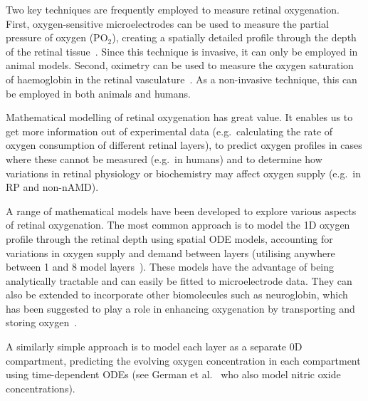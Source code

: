 \documentclass{article}
\begin{document}
Two key techniques are frequently employed to measure retinal oxygenation. First, oxygen-sensitive microelectrodes can be used to measure the partial pressure of oxygen (PO$_2$), creating a spatially detailed profile through the depth of the retinal tissue~\cite{Linsenmeier_and_Zhang_2017}. Since this technique is invasive, it can only be employed in animal models. Second, oximetry can be used to measure the oxygen saturation of haemoglobin in the retinal vasculature~\cite{Linsenmeier_and_Zhang_2017}. As a non-invasive technique, this can be employed in both animals and humans.

Mathematical modelling of retinal oxygenation has great value. It enables us to get more information out of experimental data (e.g.\ calculating the rate of oxygen consumption of different retinal layers), to predict oxygen profiles in cases where these cannot be measured (e.g.\ in humans) and to determine how variations in retinal physiology or biochemistry may affect oxygen supply (e.g.\ in RP and non-nAMD).

A range of mathematical models have been developed to explore various aspects of retinal oxygenation. The most common approach is to model the 1D oxygen profile through the retinal depth using spatial ODE models, accounting for variations in oxygen supply and demand between layers (utilising anywhere between 1 and 8 model layers~\cite{Braun_et_al_1995,Cringle_and_Yu_2002,Dollery_et_al_1969,Haugh_et_al_1990,Linsenmeier_1986,Stefansson_1988}). These models have the advantage of being analytically tractable and can easily be fitted to microelectrode data. They can also be extended to incorporate other biomolecules such as neuroglobin, which has been suggested to play a role in enhancing oxygenation by transporting and storing oxygen~\cite{Fago_et_al_2004_b,Roberts_et_al_2016a}.

A similarly simple approach is to model each layer as a separate 0D compartment, predicting the evolving oxygen concentration in each compartment using time-dependent ODEs (see German et al.~\cite{German_et_al_2021} who also model nitric oxide concentrations).
\end{document}
